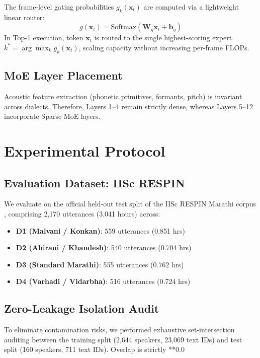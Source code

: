 \documentclass{article}
\begin{document}
The frame-level gating probabilities $g_k(\mathbf{x}_t)$ are computed via a lightweight linear router:
\begin{equation}
    g(\mathbf{x}_t) = \text{Softmax}\left( \mathbf{W}_g \mathbf{x}_t + \mathbf{b}_g \right)
\end{equation}
In Top-1 execution, token $\mathbf{x}_t$ is routed to the single highest-scoring expert $k^* = \arg\max_k g_k(\mathbf{x}_t)$, scaling capacity without increasing per-frame FLOPs.

\subsection{MoE Layer Placement}
Acoustic feature extraction (phonetic primitives, formants, pitch) is invariant across dialects. Therefore, Layers 1--4 remain strictly dense, whereas Layers 5--12 incorporate Sparse MoE layers.

\section{Experimental Protocol}

\subsection{Evaluation Dataset: IISc RESPIN}
We evaluate on the official held-out test split of the IISc RESPIN Marathi corpus \cite{respin2024}, comprising 2,170 utterances (3.041 hours) across:
\begin{itemize}
    \item \textbf{D1 (Malvani / Konkan)}: 559 utterances (0.851 hrs)
    \item \textbf{D2 (Ahirani / Khandesh)}: 540 utterances (0.704 hrs)
    \item \textbf{D3 (Standard Marathi)}: 555 utterances (0.762 hrs)
    \item \textbf{D4 (Varhadi / Vidarbha)}: 516 utterances (0.724 hrs)
\end{itemize}

\subsection{Zero-Leakage Isolation Audit}
To eliminate contamination risks, we performed exhaustive set-intersection auditing between the training split (2,644 speakers, 23,069 text IDs) and test split (160 speakers, 711 text IDs). Overlap is strictly **0.0%
\end{document}
